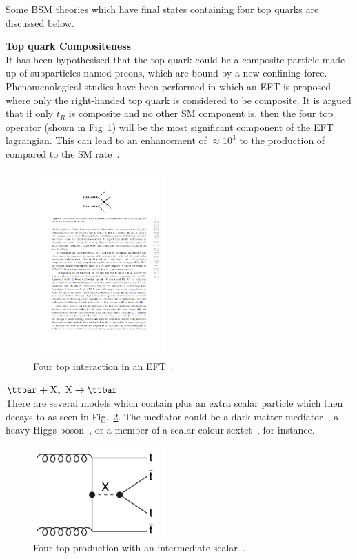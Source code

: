 Some BSM theories which have final states containing four top quarks are discussed below. 

\textbf{Top quark Compositeness}\\
It has been hypothesised that the top quark could be a composite particle made up of subparticles named preons, which are bound by a new confining force. Phenomenological studies have been performed in which an EFT is proposed where only the right-handed top quark is considered to be composite. It is argued that if only $t_{R}$ is composite and no other SM component is, then the four top operator (shown in Fig~\ref{fig:eft2}) will be the most significant component of the EFT lagrangian. This can lead to an enhancement of $\approx 10^3$ to the production of \tttt compared to the SM rate~\cite{Tait2topcomp,Tait1topcomp}.

\begin{figure}[ht!]
\centering
    \includegraphics[width=0.45\textwidth]{images/Theory/EFTTopComp.pdf}
    \caption{Four top interaction in an EFT~\cite{Tait2topcomp}.}
    \label{fig:eft2}
\end{figure}

$\boldsymbol{\ttbar+\textrm{X}, ~\textrm{X}}\rightarrow\boldsymbol{\ttbar}$\\
There are several models which contain \ttbar plus an extra scalar particle which then decays to \ttbar as seen in Fig.~\ref{fig:ttXtt}.
The mediator could be a dark matter mediator~\cite{Arina2016}, a heavy Higgs boson~\cite{Bernreuther:2015fts}, or a member of a scalar colour sextet~\cite{Cacciapaglia2015}, for instance. 

\begin{figure}[ht!]
\centering
    \includegraphics[width=0.45\textwidth]{images/Theory/ttDMtt5.png}
    \caption{Four top production with an intermediate scalar~\cite{Arina2016}.}
    \label{fig:ttXtt}
\end{figure}

